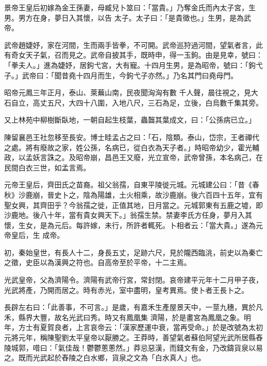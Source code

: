 \begin{pinyinscope}
 景帝王皇后初嫁為金王孫妻，母臧兒卜筮曰：「當貴。」乃奪金氏而內太子宮，生男。男方在身，夢日入其懷，以告
 太子。太子曰：「是貴徵也。」生男，是為武帝。



 武帝趙婕妤，家在河間，生而兩手皆拳，不可開。武帝巡狩過河間，望氣者言，此有奇女天子氣，召而見之。武帝自披其手，既時申，得一玉鉤。由是見幸，號曰：「拳夫人。」進為婕妤，居鉤弋宮，大有寵。十四月生男，是為昭帝，號曰：「鉤弋子。」武帝曰：「聞昔堯十四月而生，今鉤弋子亦然。」乃名其門曰堯母門。



 昭帝元鳳三年正月，泰山、萊蕪山南，民夜聞洶洶有數
 千人聲，晨往視之，見大石自立，高丈五尺，大四十八圍，入地八尺，三石為足，立後，白烏數千集其旁。



 又上林苑中柳樹斷臥地，一朝自起生枝葉，蟲齧其葉成文，曰：「公孫病已立。」



 陳留襄邑王社忽移至長安。博士眭孟占之曰：「石，陰類。泰山，岱宗，王者禪代之處。將有廢故之家，姓公孫，名病已，從白衣為天子者。」時昭帝幼少，霍光輔政，以孟妖言誅之。及昭帝崩，昌邑王又廢，光立宣帝，武帝曾孫，本名病己，在民間白衣三世，如孟言焉。



 元帝王皇后，齊田氏之苗裔。祖父翁孺，自東平陵徙元城。元城建公曰：「昔《春秋》沙鹿崩，晉史卜之，陰為陽雄，土火相乘，故沙鹿崩。後六百四十五年，宜有聖女興，其齊田乎？今翁孺之徙，正值其地，日月當之。元城郭東有五鹿之墟，即沙鹿地。後八十年，當有貴女興天下。」翁孺生禁。禁妻李氏方任身，夢月入其懷，生女，是為元后。每許嫁，未行，所許者輒死。卜相者云：「當大貴。」遂為元帝皇后，生
 成帝。



 初，秦始皇世，有長人十二，身長五丈，足跡六尺，見於隴西臨洮，前史以為秦亡之徵，史臣以為漢興之符也。自高帝至於平帝，十二主焉。



 光武皇帝，父為濟陽令。濟陽有武帝行宮，常封閉。哀帝建平元年十二月甲子夜，光武將產，乃開而居之。時有赤光，室中盡明，皇考異焉。使卜者王長卜之。



 長辟左右曰：「此善事，不可言。」是歲，有嘉禾生產屋景天中，一莖九穗，異於凡禾，縣界大豐，故名光武曰秀。時又有鳳凰集
 濟陽，於是畫宮為鳳凰之象。明年，方士有夏賀良者，上言哀帝云：「漢家歷運中衰，當再受命。」於是改號為太初元將元年，稱陳聖劉太平皇帝以厭勝之。王莽時，善望氣者蘇伯阿望光武所居縣舂陵城郭，唶曰：「氣佳哉！鬱鬱蔥蔥然。」莽忌惡漢，而錢文有金，乃改鑄貨泉以易之。既而光武起於舂陵之白水鄉，貨泉之文為「白水真人」也。




\end{pinyinscope}
